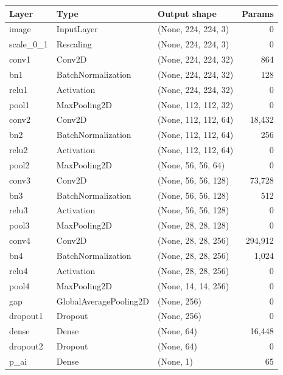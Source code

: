 \begin{tabular}{lllr}
\toprule
\textbf{Layer} & \textbf{Type} & \textbf{Output shape} & \textbf{Params} \\
\midrule
image & InputLayer & (None, 224, 224, 3) & 0 \\
scale\_0\_1 & Rescaling & (None, 224, 224, 3) & 0 \\
conv1 & Conv2D & (None, 224, 224, 32) & 864 \\
bn1 & BatchNormalization & (None, 224, 224, 32) & 128 \\
relu1 & Activation & (None, 224, 224, 32) & 0 \\
pool1 & MaxPooling2D & (None, 112, 112, 32) & 0 \\
conv2 & Conv2D & (None, 112, 112, 64) & 18,432 \\
bn2 & BatchNormalization & (None, 112, 112, 64) & 256 \\
relu2 & Activation & (None, 112, 112, 64) & 0 \\
pool2 & MaxPooling2D & (None, 56, 56, 64) & 0 \\
conv3 & Conv2D & (None, 56, 56, 128) & 73,728 \\
bn3 & BatchNormalization & (None, 56, 56, 128) & 512 \\
relu3 & Activation & (None, 56, 56, 128) & 0 \\
pool3 & MaxPooling2D & (None, 28, 28, 128) & 0 \\
conv4 & Conv2D & (None, 28, 28, 256) & 294,912 \\
bn4 & BatchNormalization & (None, 28, 28, 256) & 1,024 \\
relu4 & Activation & (None, 28, 28, 256) & 0 \\
pool4 & MaxPooling2D & (None, 14, 14, 256) & 0 \\
gap & GlobalAveragePooling2D & (None, 256) & 0 \\
dropout1 & Dropout & (None, 256) & 0 \\
dense & Dense & (None, 64) & 16,448 \\
dropout2 & Dropout & (None, 64) & 0 \\
p\_ai & Dense & (None, 1) & 65 \\
\bottomrule
\end{tabular}
